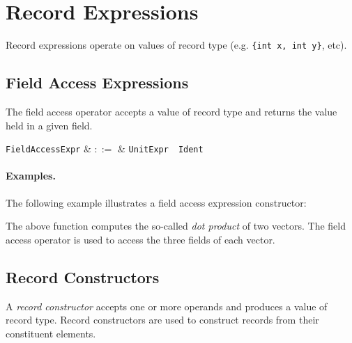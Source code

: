 
\section{Record Expressions}
\label{c_expr_record}

Record expressions operate on values of record type (e.g. \lstinline|{int x, int y}|, etc).


\subsection{Field Access Expressions}
\label{c_expr_field_access}

The field access operator accepts a value of record type and returns the value held in a given field.

\begin{syntax}
  \verb+FieldAccessExpr+ & $::=$ & \verb+UnitExpr+\ \ \verb+Ident+\\
\end{syntax}

\paragraph{Examples.}  The following example illustrates a field access expression constructor:



The above function computes the so-called {\em dot product} of two vectors.  The field access operator is used to access the three fields of each vector. 


\subsection{Record Constructors}
\label{c_expr_record_constructor}
A {\em record constructor} accepts one or more operands and produces a value of record type.  Record constructors are used to construct records from their constituent elements.  

